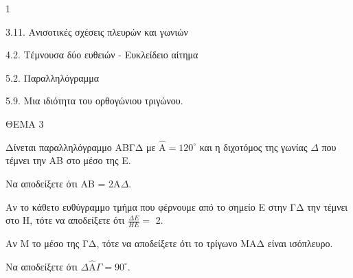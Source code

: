 \begin{ylh}{1}
    \item 3.11. Ανισοτικές σχέσεις πλευρών και γωνιών
    \item 4.2. Τέμνουσα δύο ευθειών - Ευκλείδειο αίτημα
    \item 5.2. Παραλληλόγραμμα
    \item 5.9. Μια ιδιότητα του ορθογώνιου τριγώνου.
\end{ylh}

ΘΕΜΑ 3

Δίνεται παραλληλόγραμμο ΑΒΓΔ με $\widehat{\text{A}} = 120^\circ$ και η διχοτόμος της γωνίας $\Delta$ που τέμνει την ΑΒ στο μέσο της Ε.

\begin{alist}
\item Να αποδείξετε ότι AB = 2A$\Delta$. 

\item Αν το κάθετο ευθύγραμμο τμήμα που φέρνουμε από το σημείο Ε στην ΓΔ την τέμνει στο Η, τότε να αποδείξετε ότι $\frac{\Delta Ε}{ΗΕ} =$ 2. 

\item Αν Μ το μέσο της ΓΔ, τότε να αποδείξετε ότι το τρίγωνο ΜΑΔ είναι ισόπλευρο.


\item Να αποδείξετε ότι $\Delta\widehat{\text{A}}\Gamma = 90^\circ$. 


\begin{center}
\end{center}
\end{alist}
